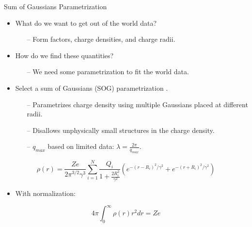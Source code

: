 \documentclass[10pt]{beamer}
\begin{document}
\begin{frame}[fragile]{Sum of Gaussians Parametrization}

	\begin{itemize}
		\item What do we want to get out of the world data?
		\begin{itemize}
			\pause
			\item[--] \alert{Form factors}, \alert{charge densities}, and \alert{charge radii}.
		\end{itemize}
		\pause
		\item How do we find these quantities?
		\begin{itemize}
			\pause
			\item[--] We need some \alert{parametrization} to fit the world data.
		\end{itemize}
		\pause
		\item Select a \alert{sum of Gaussians} (SOG) parametrization \cite{Article:SOG}.
		\begin{itemize}
			\pause
			\item[--] Parametrizes charge density using \alert{multiple Gaussians placed at different radii}.
			\item[--] Disallows unphysically small structures in the charge density.
			\item[--] $q_{max}$ based on limited data: \alert{$\lambda = \frac{2\pi}{q_{max}}$}.
		\end{itemize}
	\end{itemize}
	
	\pause
	\vspace{-2mm}
	\begin{equation} \label{eq:sog_rho}
		\rho(r) = \frac{Ze}{2 \pi^{3/2}\gamma^3} \sum_{i=1}^N \frac{Q_i}{1+\frac{2R_i^2}{\gamma^2}} \left( e^{-\left( r-R_i \right)^2/\gamma^2} + e^{-\left( r+R_i \right)^2/\gamma^2} \right)
	\end{equation}
	
	\begin{itemize}
		\item With normalization:
	\end{itemize}		
	
	\vspace{-2mm}
	\begin{equation} \label{eq:normalization}
		4 \pi \int_0^{\infty} \rho(r) r^2 dr = Ze
	\end{equation}

\end{frame}
\end{document}
